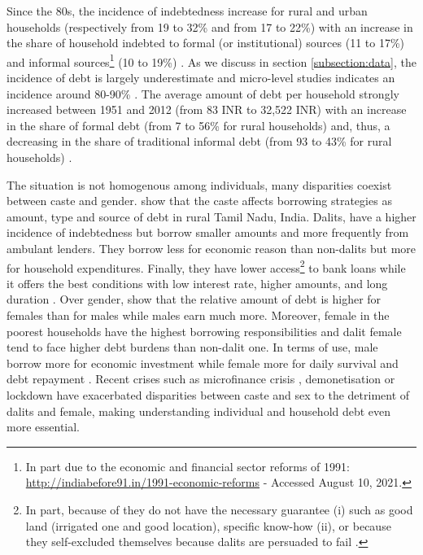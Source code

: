 \documentclass[a4paper, 11pt, onecolumn]{article}
\begin{document}
Since the 80s, the incidence of indebtedness increase for rural and urban households (respectively from 19 to 32\% and from 17 to 22\%) with an increase in the share of household indebted to formal (or institutional) sources (11 to 17\%) and informal sources\footnote{In part due to the economic and financial sector reforms of 1991: \url{http://indiabefore91.in/1991-economic-reforms} - Accessed August 10, 2021.} (10 to 19\%) \citep{Rajakumar2019}.
As we discuss in section \ref{subsection:data}, the incidence of debt is largely underestimate \citep{Jones1994} and micro-level studies indicates an incidence around 80-90\% \citep{Guerin2013a, Jones1994, Dreze1997, Reboul2021}.
The average amount of debt per household strongly increased between 1951 and 2012 (from 83 INR to 32,522 INR) with an increase in the share of formal debt (from 7 to 56\% for rural households) and, thus, a decreasing in the share of traditional informal debt (from 93 to 43\% for rural households) \citep{Rajakumar2019}.

The situation is not homogenous among individuals, many disparities coexist between caste and gender.
\cite{Guerin2013a} show that the caste affects borrowing strategies as amount, type and source of debt in rural Tamil Nadu, India.
Dalits, have a higher incidence of indebtedness but borrow smaller amounts and more frequently from ambulant lenders.
They borrow less for economic reason than non-dalits but more for household expenditures. %
Finally, they have lower access\footnote{In part, because of they do not have the necessary guarantee (i) such as good land (irrigated one and good location), specific know-how (ii), or because they self-excluded themselves because dalits are persuaded to fail \citep{Guerin2013a}.} to bank loans while it offers the best conditions with low interest rate, higher amounts, and long duration \citep{Chavan2007}.
Over gender, \cite{Reboul2021} show that the relative amount of debt is higher for females than for males while males earn much more.
Moreover, female in the poorest households have the highest borrowing responsibilities and dalit female tend to face higher debt burdens than non-dalit one.
In terms of use, male borrow more for economic investment while female more for daily survival and debt repayment \citep{Reboul2021}.
Recent crises such as microfinance crisis \citep{Nair2011, Sriram2010}, demonetisation \citep{GuerinDemo2017} or lockdown \citep{Guerin2021, Guerin2021b} have exacerbated disparities between caste and sex to the detriment of dalits and female, making understanding individual and household debt even more essential.
\end{document}
